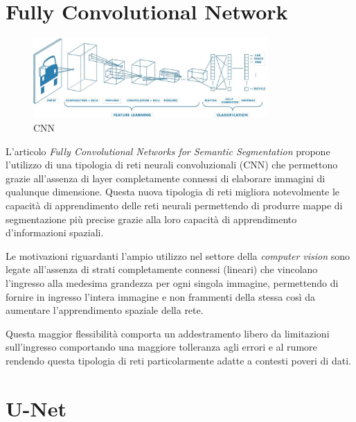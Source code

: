 \section{Fully Convolutional Network} 
\begin{figure}[H]
  \begin{center}
    \includegraphics[width=0.8\textwidth]{Immagini/cnn.png}
  \end{center}
  \caption{CNN}
  \label{fig:cnn}
\end{figure}



\label{sec:fcn} L'articolo \textit{Fully
Convolutional Networks for Semantic Segmentation} \cite{long2015fully} propone
l'utilizzo di una tipologia di reti neurali convoluzionali (CNN) che permettono
grazie all'assenza di layer completamente connessi di elaborare immagini di
qualunque dimensione. Questa nuova tipologia di reti migliora notevolmente le capacità di apprendimento delle reti neurali permettendo di produrre mappe
di segmentazione più precise grazie alla loro capacità di apprendimento d'informazioni spaziali.

Le motivazioni riguardanti l'ampio utilizzo nel settore della
\textit{computer vision} sono legate all'assenza di strati completamente
connessi (lineari) che vincolano l'ingresso alla medesima grandezza per ogni
singola immagine, permettendo di fornire in ingresso l'intera immagine e non
frammenti della stessa così da aumentare l'apprendimento spaziale della rete.

Questa maggior flessibilità comporta un addestramento libero da limitazioni
sull'ingresso comportando una maggiore tolleranza agli errori e al rumore
rendendo questa tipologia di reti particolarmente adatte a contesti poveri di
dati.




\section{U-Net} \label{sec:unet} 

